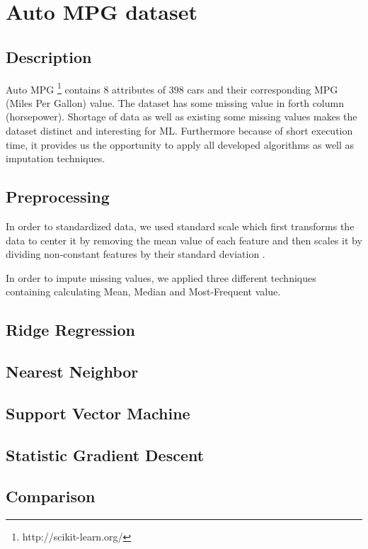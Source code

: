 \section{Auto MPG dataset}
\subsection{Description}
Auto MPG \footnote{http://scikit-learn.org/} contains 8 attributes of 398 cars  and their corresponding MPG (Miles Per Gallon) value. The dataset has some missing value in forth column (horsepower). Shortage of data as well as existing some missing values makes the dataset distinct and interesting for ML. Furthermore because of short execution time, it provides us the opportunity to apply all developed algorithms as well as imputation techniques.

\subsection{Preprocessing}
In order to standardized data, we used standard scale which first transforms the data to center it by removing the mean value of each feature and then scales it by dividing non-constant features by their standard deviation \cite{scikitstandardization}.

In order to impute missing values, we applied three different techniques containing calculating Mean, Median and Most-Frequent value.

\subsection{Ridge Regression}

\subsection{Nearest Neighbor}
\subsection{Support Vector Machine}
\subsection{Statistic Gradient Descent}
\subsection{Comparison}
